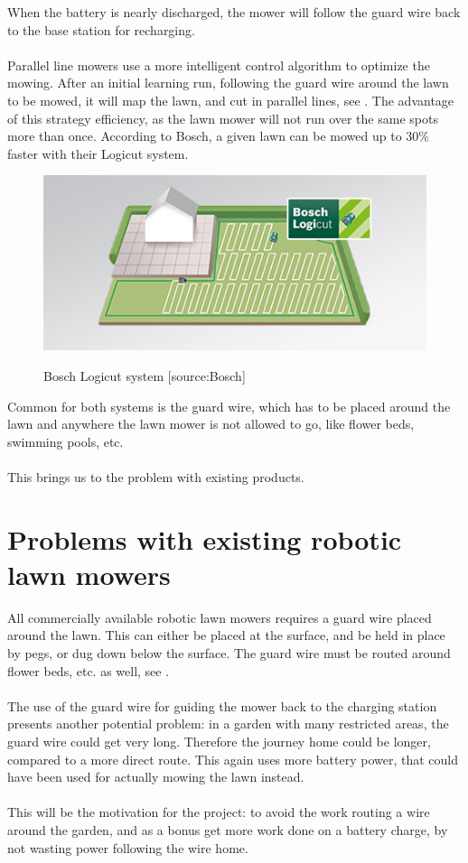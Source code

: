 \noindent
When the battery is nearly discharged, the mower will follow the guard wire back to the base station for recharging.\\\\
\noindent
Parallel line mowers use a more intelligent control algorithm to optimize the mowing. After an initial learning run, following the guard wire around the lawn to be mowed, it will map the lawn, and cut in parallel lines, see . The advantage of this strategy efficiency, as the lawn mower will not run over the same spots more than once. According to Bosch, a given lawn can be mowed up to 30\% faster with their Logicut system.
 

\begin{figure}[H]
\centering
\includegraphics[scale=0.8]{figures/logicut.jpg} 
\label{fig:logicut}
\caption{Bosch Logicut system [source:Bosch]} 
\end{figure}

\noindent
Common for both systems is the guard wire, which has to be placed around the lawn and anywhere the lawn mower is not allowed to go, like flower beds, swimming pools, etc. \\\\
\noindent
This brings us to the problem with existing products.

\section{Problems with existing robotic lawn mowers}
All commercially available robotic lawn mowers requires a guard wire placed around the lawn. This can either be placed at the surface, and be held in place by pegs, or dug down below the surface. The guard wire must be routed around flower beds, etc. as well, see .\\\\
\noindent
The use of the guard wire for guiding the mower back to the charging station presents another potential problem: in a garden with many restricted areas, the guard wire could get very long. Therefore the journey home could be longer, compared to a more direct route. This again uses more battery power, that could have been used for actually mowing the lawn instead.\\\\
\noindent
This will be the motivation for the project: to avoid the work routing a wire around the garden, and as a bonus get more work done on a battery charge, by not wasting power following the wire home.\\\\
\noindent

